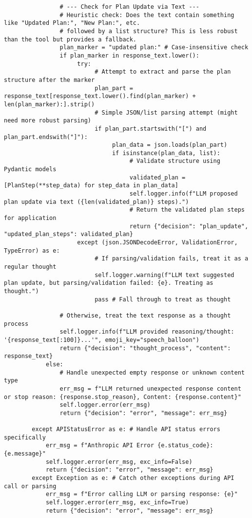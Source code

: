 \documentclass[12pt,a4paper]{article}
\begin{document}
\begin{pageablecode}
\begin{verbatim}
                # --- Check for Plan Update via Text ---
                # Heuristic check: Does the text contain something like "Updated Plan:", "New Plan:", etc.
                # followed by a list structure? This is less robust than the tool but provides a fallback.
                plan_marker = "updated plan:" # Case-insensitive check
                if plan_marker in response_text.lower():
                     try:
                          # Attempt to extract and parse the plan structure after the marker
                          plan_part = response_text[response_text.lower().find(plan_marker) + len(plan_marker):].strip()
                          # Simple JSON/list parsing attempt (might need more robust parsing)
                          if plan_part.startswith("[") and plan_part.endswith("]"):
                               plan_data = json.loads(plan_part)
                               if isinstance(plan_data, list):
                                    # Validate structure using Pydantic models
                                    validated_plan = [PlanStep(**step_data) for step_data in plan_data]
                                    self.logger.info(f"LLM proposed plan update via text ({len(validated_plan)} steps).")
                                    # Return the validated plan steps for application
                                    return {"decision": "plan_update", "updated_plan_steps": validated_plan}
                     except (json.JSONDecodeError, ValidationError, TypeError) as e:
                          # If parsing/validation fails, treat it as a regular thought
                          self.logger.warning(f"LLM text suggested plan update, but parsing/validation failed: {e}. Treating as thought.")
                          pass # Fall through to treat as thought

                # Otherwise, treat the text response as a thought process
                self.logger.info(f"LLM provided reasoning/thought: '{response_text[:100]}...'", emoji_key="speech_balloon")
                return {"decision": "thought_process", "content": response_text}
            else:
                # Handle unexpected empty response or unknown content type
                err_msg = f"LLM returned unexpected response content or stop reason: {response.stop_reason}, Content: {response.content}"
                self.logger.error(err_msg)
                return {"decision": "error", "message": err_msg}

        except APIStatusError as e: # Handle API status errors specifically
            err_msg = f"Anthropic API Error {e.status_code}: {e.message}"
            self.logger.error(err_msg, exc_info=False)
            return {"decision": "error", "message": err_msg}
        except Exception as e: # Catch other exceptions during API call or parsing
            err_msg = f"Error calling LLM or parsing response: {e}"
            self.logger.error(err_msg, exc_info=True)
            return {"decision": "error", "message": err_msg}



\end{verbatim}
\end{pageablecode}
\end{document}
